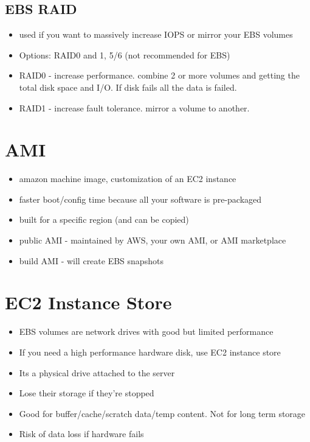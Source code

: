 \documentclass[]{scrartcl}
\begin{document}
\subsection{EBS RAID}
\begin{itemize}
	\item used if you want to massively increase IOPS or mirror your EBS volumes
	\item Options: RAID0 and 1, 5/6 (not recommended for EBS)
	\item RAID0 - increase performance. combine 2 or more volumes and getting the total disk space and I/O. If disk fails all the data is failed. 
	\item RAID1 - increase fault tolerance. mirror a volume to another. 
\end{itemize}

\section{AMI}
\begin{itemize}
	\item amazon machine image, customization of an EC2 instance
	\item faster boot/config time because all your software is pre-packaged
	\item built for a specific region (and can be copied)
	\item public AMI - maintained by AWS, your own AMI, or AMI marketplace
	\item build AMI - will create EBS snapshots
\end{itemize}

\section{EC2 Instance Store}
\begin{itemize}
	\item EBS volumes are network drives with good but limited performance
	\item If you need a high performance hardware disk, use EC2 instance store
	\item Its a physical drive attached to the server
	\item Lose their storage if they're stopped
	\item Good for buffer/cache/scratch data/temp content. Not for long term storage
	\item Risk of data loss if hardware fails
\end{itemize}
\end{document}
